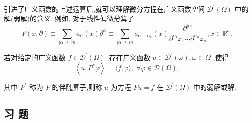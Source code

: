 \documentclass[lang=cn,newtx,10pt,scheme=chinese,thmcnt=chapter]{elegantbook}
\begin{document}
引进了广义函数的上述运算后,就可以理解微分方程在广义函数空间 \({\mathcal{D}}^{\prime }\left( \Omega \right)\) 中的解(弱解)的含义. 例如, 对于线性偏微分算子
\begin{equation*}
P\left( {x,\partial }\right)  \equiv  \mathop{\sum }\limits_{{\left| \alpha \right|  \leqslant  m}}{a}_{\alpha }\left( x\right) {\partial }^{\alpha }
\equiv  \mathop{\sum }\limits_{{\left| \alpha \right|  \leqslant  m}}{a}_{{\alpha }_{1}\cdots {\alpha }_{n}}\left( x\right) \frac{{\partial }^{\left| \alpha \right| }}{{\partial }^{{\alpha }_{1}}{x}_{1}\cdots {\partial }^{{\alpha }_{n}}{x}_{n}},x \in  {\mathbb{R}}^{n},
\end{equation*}
\begin{definition}
  若对给定的广义函数 \(f \in  {\mathcal{D}}^{\prime }\left( \Omega \right)\) ,存在广义函数 \(u \in  {\mathcal{D}}^{\prime }\left( \omega \right) ,\omega  \subset  \Omega\) ,使得  
  \begin{equation*}
  \left\langle  {u,{P}^{ * }\varphi }\right\rangle   = \langle f,\varphi \rangle ,\;\forall \varphi  \in  \mathcal{D}\left( \Omega \right) ,
  \end{equation*}
  
  其中 \({P}^{ * }\) 称为 \(P\) 的伴随算子,则称 \(u\) 为方程 \({Pu} = f\) 在 \({\mathcal{D}}^{\prime }\left( \Omega \right)\) 中的弱解或解.
  
\end{definition}
\subsection{习 题}
\end{document}
